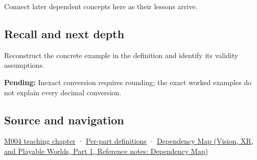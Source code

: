 \hypertarget{appendix-6854d0e2218e-used-by}{}

Connect later dependent concepts here as their lessons arrive.

\subsection{Recall and next depth}\label{appendix-6854d0e2218e-recall-and-next-depth}

\hypertarget{appendix-6854d0e2218e-recall-and-next-depth}{}

Reconstruct the concrete example in the definition and identify its validity assumptions.

\textbf{Pending:} Inexact conversion requires rounding; the exact worked examples do not explain every decimal conversion.

\subsection{Source and navigation}\label{appendix-6854d0e2218e-source-and-navigation}

\hypertarget{appendix-6854d0e2218e-source-and-navigation}{}

\hyperref[01-foundations-i-ch001-a-stretching-ruler-for-real-valued-quantities]{M004 teaching chapter} · \hyperref[appendix-fd090d982a15-m004---parts-61-76]{Per-part definitions} · \href{../07-Vision-XR-and-Playable-Worlds-P01/main.pdf\#appendix-4ad47bdd269a}{Dependency Map (Vision, XR, and Playable Worlds, Part 1, Reference notes: Dependency Map)}
